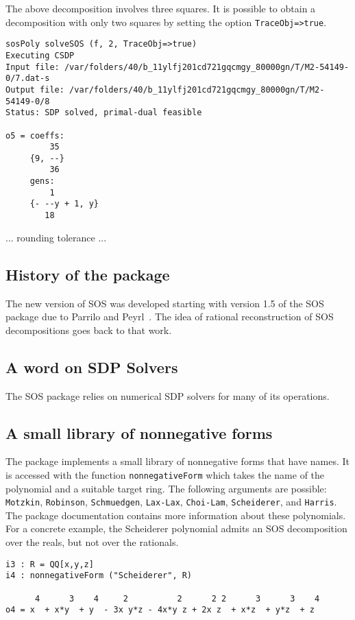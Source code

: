 \documentclass[11pt]{amsart}
\theoremstyle{plain}%
\theoremstyle{definition}
\theoremstyle{remark}
\newcommand{\SOS}{\textsc{SOS}\xspace}
\begin{document}
The above decomposition involves three squares.
It is possible to obtain a decomposition with only two squares by setting the option \verb|TraceObj=>true|.
{\small
\begin{verbatim}
sosPoly solveSOS (f, 2, TraceObj=>true)
Executing CSDP
Input file: /var/folders/40/b_11ylfj201cd721gqcmgy_80000gn/T/M2-54149-0/7.dat-s
Output file: /var/folders/40/b_11ylfj201cd721gqcmgy_80000gn/T/M2-54149-0/8
Status: SDP solved, primal-dual feasible

o5 = coeffs:
         35
     {9, --}
         36
     gens:
         1
     {- --y + 1, y}
        18
\end{verbatim}
}

... rounding tolerance ...

\subsection{History of the package}
The new version of \SOS was developed starting with version 1.5 of the
\SOS package due to Parrilo and Peyrl~\cite{peyrl2008computing}.
The idea of rational reconstruction of SOS decompositions goes back to
that work.

\subsection{A word on SDP Solvers}
The \SOS package relies on numerical SDP solvers for many of its
operations.

\subsection{A small library of nonnegative forms}
The package implements a small library of nonnegative forms that have
names.
It is accessed with the function \verb|nonnegativeForm| which
takes the name of the polynomial and a suitable target ring.
The following arguments are possible: \verb|Motzkin|, \verb|Robinson|,
\verb|Schmuedgen|, \verb|Lax-Lax|, \verb|Choi-Lam|, \verb|Scheiderer|,
and \verb|Harris|.
The package documentation contains more information about these polynomials.  
For a concrete example, the Scheiderer polynomial admits an SOS decomposition over the reals, but not over the rationals.
{\small
\begin{verbatim}
i3 : R = QQ[x,y,z]
i4 : nonnegativeForm ("Scheiderer", R)

      4      3    4     2          2      2 2      3      3    4
o4 = x  + x*y  + y  - 3x y*z - 4x*y z + 2x z  + x*z  + y*z  + z

\end{verbatim}
}
\end{document}
